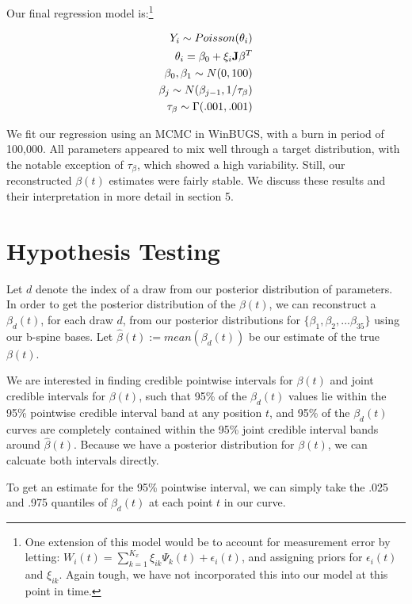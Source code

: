 \documentclass[12pt]{article}
\newcommand{\es}[1]{\begin{equation*}\begin{split} #1 \end{split} \end{equation*}}
\begin{document}
Our final regression model is:\footnote{One extension of this model would be to account for measurement error by letting: $W_i(t)=
\sum_{k=1}^{K_x} \xi_{ik} \Psi_k(t) + \epsilon_i(t)$, and assigning priors for $\epsilon_i(t)$ and $\xi_{ik}$.\cite{crainiceanu2010bayesian} Again tough, we have not incorporated this into our model at this point in time.}

\es{
Y_i \sim Poisson(\theta_i) \\
 \theta_i  = \beta_0+ \xi_{i} \bold{J} \beta^T  \\
\beta_0, \beta_1 \sim N(0,100) \\
 \beta_j \sim N(\beta_{j-1},1/\tau_\beta) \\
 \tau_\beta \sim \Gamma(.001,.001)\\
 }


We fit our regression using an MCMC in WinBUGS, with a burn in period of 100,000. All parameters appeared to mix well through a target distribution, with the notable exception of $\tau_\beta$, which showed a high variability. Still, our reconstructed $\beta(t)$ estimates were fairly stable. We discuss these results and their interpretation in more detail in section 5.

\section{Hypothesis Testing}

Let $d$ denote the index of a draw from our posterior distribution of parameters. In order to get the posterior distribution of the $\beta(t)$, we can reconstruct a $\beta_d(t)$, for each draw $d$, from our posterior distributions for $\{\beta_1,\beta_2, ... \beta_{35}\}$ using our b-spine bases. Let $\hat{\beta}(t) := mean(\beta_d(t))$ be our estimate of the true $\beta(t)$.

We are interested in finding credible pointwise intervals for $\beta(t)$ and joint credible intervals for $\beta(t)$, such that 95\% of the $\beta_d(t)$ values lie within the 95\% pointwise credible interval band at any position $t$, and 95\% of the $\beta_d(t)$ curves are completely contained within the 95\% joint credible interval bands around $\hat{\beta}(t)$. Because we have a posterior distribution for $\beta(t)$, we can calcuate both intervals directly.

To get an estimate for the 95\% pointwise interval, we can simply take the .025 and .975 quantiles of $\beta_d(t)$ at each point $t$ in our curve.
\end{document}
